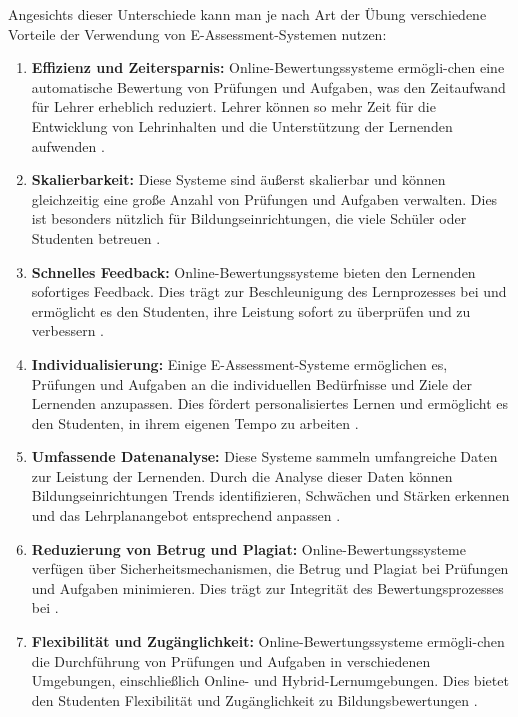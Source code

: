 Angesichts dieser Unterschiede kann man je nach Art der Übung verschiedene Vorteile der Verwendung von E-Assessment-Systemen nutzen:

\begin{enumerate}
    \item \textbf{Effizienz und Zeitersparnis:} Online-Bewertungssysteme ermögli-chen eine automatische Bewertung von Prüfungen und Aufgaben, was den Zeitaufwand für Lehrer erheblich reduziert. Lehrer können so mehr Zeit für die Entwicklung von Lehrinhalten und die Unterstützung der Lernenden aufwenden \cite{alruwais2018advantages}.

    \item \textbf{Skalierbarkeit:} Diese Systeme sind äußerst skalierbar und können gleichzeitig eine große Anzahl von Prüfungen und Aufgaben verwalten. Dies ist besonders nützlich für Bildungseinrichtungen, die viele Schüler oder Studenten betreuen \cite{gruttmann2009formatives}  \cite{alruwais2018advantages}.

    \item \textbf{Schnelles Feedback:} Online-Bewertungssysteme bieten den Lernenden sofortiges Feedback. Dies trägt zur Beschleunigung des Lernprozesses bei und ermöglicht es den Studenten, ihre Leistung sofort zu überprüfen und zu verbessern \cite{gruttmann2009formatives} \cite{alruwais2018advantages}.

    \item \textbf{Individualisierung:} Einige E-Assessment-Systeme ermöglichen es, Prüfungen und Aufgaben an die individuellen Bedürfnisse und Ziele der Lernenden anzupassen. Dies fördert personalisiertes Lernen und ermöglicht es den Studenten, in ihrem eigenen Tempo zu arbeiten \cite{alruwais2018advantages}.

    \item \textbf{Umfassende Datenanalyse:} Diese Systeme sammeln umfangreiche Daten zur Leistung der Lernenden. Durch die Analyse dieser Daten können Bildungseinrichtungen Trends identifizieren, Schwächen und Stärken erkennen und das Lehrplanangebot entsprechend anpassen \cite{alruwais2018advantages}.

    \item \textbf{Reduzierung von Betrug und Plagiat:} Online-Bewertungssysteme verfügen über Sicherheitsmechanismen, die Betrug und Plagiat bei Prüfungen und Aufgaben minimieren. Dies trägt zur Integrität des Bewertungsprozesses bei \cite{alruwais2018advantages}.

    \item \textbf{Flexibilität und Zugänglichkeit:} Online-Bewertungssysteme ermögli-chen die Durchführung von Prüfungen und Aufgaben in verschiedenen Umgebungen, einschließlich Online- und Hybrid-Lernumgebungen. Dies bietet den Studenten Flexibilität und Zugänglichkeit zu Bildungsbewertungen \cite{gruttmann2009formatives} \cite{alruwais2018advantages}.
\end{enumerate}


